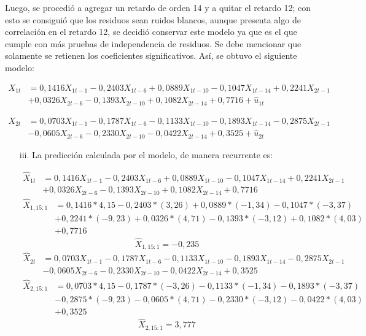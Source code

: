 \begin{enumerate}
Luego, se procedi\'{o} a agregar un retardo de orden 14 y a quitar el retardo 12; con esto se consigui\'{o} que los residuos sean ruidos blancos, aunque presenta algo de correlaci\'{o}n en el retardo 12, se decidi\'{o} conservar este modelo ya que es el que cumple con m\'{a}s pruebas de independencia de residuos. Se debe mencionar que solamente se retienen los coeficientes significativos. As\'{i}, se obtuvo el siguiente modelo:

\begin{align*}
X_{1t} &= 0,1416X_{1t-1}-0,2403X_{1t-6}+0,0889X_{1t-10}-0,1047X_{1t-14}+0,2241X_{2t-1}\\
       & +0,0326X_{2t-6}-0,1393X_{2t-10}+0,1082X_{2t-14}+0,7716+\hat{u}_{1t}
\end{align*}

\begin{align*}
X_{2t} &= 0,0703X_{1t-1}-0,1787X_{1t-6}-0,1133X_{1t-10}-0,1893X_{1t-14}-0,2875X_{2t-1}\\
       & -0,0605X_{2t-6}-0,2330X_{2t-10}-0,0422X_{2t-14}+0,3525+\hat{u}_{2t}
\end{align*}

\begin{enumerate}
      \item[iii.] La predicci\'{o}n calculada por el modelo, de manera recurrente es:
      
\begin{align*}
\hat{X}_{1t} &= 0,1416X_{1t-1}-0,2403X_{1t-6}+0,0889X_{1t-10}-0,1047X_{1t-14}+0,2241X_{2t-1}\\
             & +0,0326X_{2t-6}-0,1393X_{2t-10}+0,1082X_{2t-14}+0,7716
\end{align*}
\begin{align*}
\hat{X}_{1,15:1} &= 0,1416\ast 4,15-0,2403\ast(3,26)+0,0889\ast(-1,34)-0,1047\ast(-3,37)\\
                 & +0,2241\ast(-9,23)+0,0326\ast(4,71)-0,1393\ast(-3,12)+0,1082\ast(4,03)\\
                 & +0,7716
\end{align*}
\[
\hat{X}_{1,15:1}=-0,235
\]
\begin{align*}
\hat{X}_{2t} &= 0,0703X_{1t-1}-0,1787X_{1t-6}-0,1133X_{1t-10}-0,1893X_{1t-14}-0,2875X_{2t-1}\\
             &  -0,0605X_{2t-6}-0,2330X_{2t-10}-0,0422X_{2t-14}+0,3525
\end{align*}
\begin{align*}
\hat{X}_{2,15:1} &= 0,0703\ast 4,15-0,1787\ast(-3,26)-0,1133\ast(-1,34)-0,1893\ast(-3,37)\\
                 & -0,2875\ast(-9,23)-0,0605\ast(4,71)-0,2330\ast(-3,12)-0,0422\ast(4,03)\\
                 & +0,3525
\end{align*}
\[
\hat{X}_{2,15:1}=3,777
\]
\end{enumerate}


\end{enumerate}
